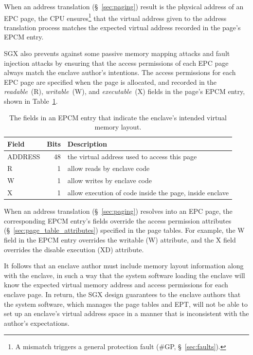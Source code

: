 When an address translation (\S~\ref{sec:paging}) result is the physical
address of an EPC page, the CPU ensures\footnote{A mismatch triggers a general
protection fault (\#GP, \S~\ref{sec:faults}).} that the virtual address given
to the address translation process matches the expected virtual address
recorded in the page's EPCM entry.

SGX also prevents against some passive memory mapping attacks and fault
injection attacks by ensuring that the access permissions of each EPC page
always match the enclave author's intentions. The access permissions for each
EPC page are specified when the page is allocated, and recorded in the
\textit{readable}~(R), \textit{writable}~(W), and \textit{executable}~(X)
fields in the page's EPCM entry, shown in
Table~\ref{fig:sgx_epcm_access_fields}.

\begin{table}[hbt]
  \centering
  \begin{tabularx}{\columnwidth}{| l | r | X |}
  \hline
  \textbf{Field} & \textbf{Bits} & \textbf{Description}\\
  \hline
  ADDRESS & 48 & the virtual address used to access this page\\
  \hline
  R & 1 & allow reads by enclave code\\
  \hline
  W & 1 & allow writes by enclave code\\
  \hline
  X & 1 & allow execution of code inside the page, inside enclave\\
  \hline
  \end{tabularx}
  \caption{
    The fields in an EPCM entry that indicate the enclave's intended virtual
    memory layout.
  }
  \label{fig:sgx_epcm_access_fields}
\end{table}

When an address translation (\S~\ref{sec:paging}) resolves into an EPC page,
the corresponding EPCM entry's fields override the access permission attributes
(\S~\ref{sec:page_table_attributes}) specified in the page tables. For example,
the W field in the EPCM entry overrides the writable (W) attribute, and the X
field overrides the disable execution (XD) attribute.


It follows that an enclave author must include memory layout information along
with the enclave, in such a way that the system software loading the enclave
will know the expected virtual memory address and access permissions for each
enclave page. In return, the SGX design guarantees to the enclave authors that
the system software, which manages the page tables and EPT, will not be able to
set up an enclave's virtual address space in a manner that is inconsistent with
the author's expectations.

